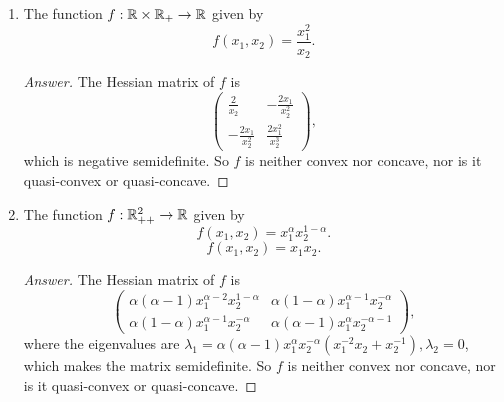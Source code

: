 \begin{enumerate}
	\[ f(x_1,x_2)=\frac{x_1}{x_2}. \]
	\begin{proof}
	The Hessian matrix of \(f\) is
	\[ \begin{pmatrix} 0 & -\frac{1}{x_2^2} \\ -\frac{1}{x_2^2} & \frac{2x_1}{x_2^3} \end{pmatrix}. \]
	And the eigenvalue of it is
	\[ \lambda_{1,2}=\frac{x_1\pm\sqrt{x_1^2+x_2^2}}{x_2^3}. \]
	So \(\lambda_1>0,\lambda_2<0,\forall x_1,x_2\in\R^+\), which means the matrix is always indefinite.
	So \(f\) is neither convex nor concave, nor is it quasi-convex or quasi-concave.
	\end{proof}
	\item The function \(f: \mathbb{R}\times\mathbb{R}_+ \to \mathbb{R}\) given by
	\[ f(x_1,x_2)=\frac{x_1^2}{x_2}. \]
	\begin{proof}[Answer]
	The Hessian matrix of \(f\) is
	\[ \begin{pmatrix} \frac{2}{x_2} & -\frac{2x_1}{x_2^2} \\ -\frac{2x_1}{x_2^2} & \frac{2x_1^2}{x_2^3} \end{pmatrix}, \]
	which is negative semidefinite.
	So \(f\) is neither convex nor concave, nor is it quasi-convex or quasi-concave.
	\end{proof}
	\item The function \(f: \mathbb{R}_{++}^2 \to \mathbb{R}\) given by
	\[ f(x_1,x_2)=x_1^\alpha x_2^{1-\alpha}. \]
	\[ f(x_1,x_2)=x_1 x_2. \]
	\begin{proof}[Answer]
	The Hessian matrix of \(f\) is
	\[ \begin{pmatrix} \alpha(\alpha-1)x_1^{\alpha-2}x_2^{1-\alpha}  & \alpha(1-\alpha)x_1^{\alpha-1}x_2^{-\alpha} \\ \alpha(1-\alpha)x_1^{\alpha-1}x_2^{-\alpha} & \alpha(\alpha-1)x_1^{\alpha}x_2^{-\alpha-1} \end{pmatrix}, \]
	where the eigenvalues are \(\lambda_1=\alpha(\alpha-1)x_1^{\alpha}x_2^{-\alpha}\left(x_1^{-2}x_2+x_2^{-1}\right),\lambda_2=0\), which makes the matrix semidefinite.
	So \(f\) is neither convex nor concave, nor is it quasi-convex or quasi-concave.
	\end{proof}
\end{enumerate}


